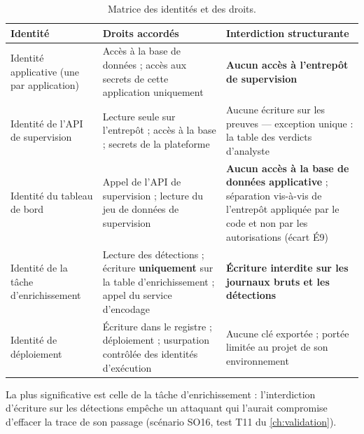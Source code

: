 \begin{table}[htbp]
\caption{Matrice des identités et des droits.}
\label{tab:matrice-identites}
\centering
\footnotesize
\setlength{\tabcolsep}{3.5pt}
\renewcommand{\arraystretch}{1.05}
\begin{tabular}{|P{3.4cm}|P{6.1cm}|P{5.6cm}|}
\hline
Identité & Droits accordés & Interdiction structurante \\
\hline
Identité applicative (une par application) & Accès à la base de données ; accès aux secrets de
cette application uniquement & \textbf{Aucun accès à l'entrepôt de supervision} \\ \hline
Identité de l'API de supervision & Lecture seule sur l'entrepôt ; accès à la base ; secrets de
la plateforme & Aucune écriture sur les preuves --- exception unique : la table des verdicts
d'analyste \\ \hline
Identité du tableau de bord & Appel de l'API de supervision ; lecture du jeu de données de
supervision & \textbf{Aucun accès à la base de données applicative} ; séparation vis-à-vis de
l'entrepôt appliquée par le code et non par les autorisations (écart É9) \\ \hline
Identité de la tâche d'enrichissement & Lecture des détections ; écriture \textbf{uniquement}
sur la table d'enrichissement ; appel du service d'encodage & \textbf{Écriture interdite sur les
journaux bruts et les détections} \\ \hline
Identité de déploiement & Écriture dans le registre ; déploiement ; usurpation
contrôlée des identités d'exécution & Aucune clé exportée ; portée limitée au projet de son
environnement \\
\hline
\end{tabular}
\end{table}

La plus significative est celle de la tâche d'enrichissement : l'interdiction d'écriture sur les
détections empêche un attaquant qui l'aurait compromise d'effacer la trace de son passage (scénario
SO16, test T11 du \cref{ch:validation}).

